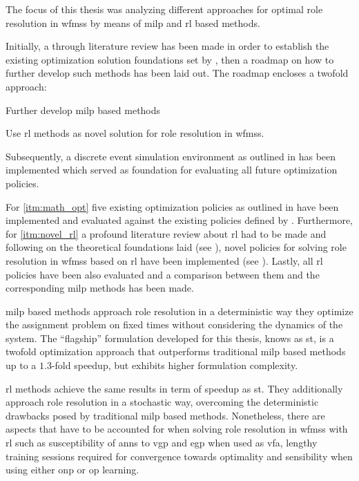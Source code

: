 The focus of this thesis was analyzing different approaches for optimal role resolution in \glspl{wfms} by means of \gls{milp} and \gls{rl} based methods.

Initially, a through literature review has been made in order to establish the existing optimization solution \ie foundations set by \citet{Zeng2005}, then a roadmap on how to further develop such methods has been laid out. The roadmap encloses a twofold approach:
\begin{enumerate*}[ref=Approach \Roman*]
 	\item Further develop \gls{milp} based methods \label{itm:math_opt}
 	\item Use \gls{rl} methods as novel solution for role resolution in \glspl{wfms}. \label{itm:novel_rl}
 \end{enumerate*} 

Subsequently, a discrete event simulation environment as outlined in  has been implemented which served as foundation for evaluating all future optimization policies.

For \ref{itm:math_opt} five existing optimization policies as outlined in  have been implemented and evaluated against the existing policies defined by \citet[pp. 13--14]{Zeng2005}. Furthermore, for \ref{itm:novel_rl} a profound literature review about \gls{rl} had to be made and following on the theoretical foundations laid (see ), novel policies for solving role resolution in \glspl{wfms} based on \gls{rl} have been implemented (see ). Lastly, all \gls{rl} policies have been also evaluated and a comparison between them and the corresponding \gls{milp} methods has been made.

\gls{milp} based methods approach role resolution in a deterministic way \ie they optimize the assignment problem on fixed times without considering the dynamics of the system. The ``flagship'' formulation developed for this thesis, knows as \gls{st}, is a twofold optimization approach that outperforms traditional \gls{milp} based methods up to a $1.3$-fold speedup, but exhibits higher formulation complexity. 

\gls{rl} methods achieve the same results in term of speedup as \gls{st}. They additionally approach role resolution in a stochastic way, overcoming the deterministic drawbacks posed by traditional \gls{milp} based methods. Nonetheless, there are aspects that have to be accounted for when solving role resolution in \glspl{wfms} with \gls{rl} such as susceptibility of \glspl{ann} to \gls{vgp} and \gls{egp} when used as \gls{vfa}, lengthy training sessions required for convergence towards optimality and sensibility when using either \gls{onp} or \gls{op} learning.


